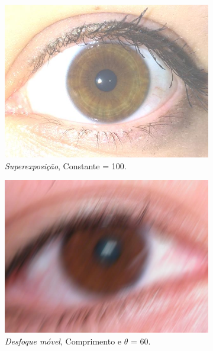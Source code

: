 \begin{figure}[H]
\medskip
\begin{subfigure}{0.25\textwidth}
  \includegraphics[width=\linewidth]{img/Resultados/ruidos/over_exposure100.jpg}
  \caption{\textit{Superexposição}, Constante = 100.}
\end{subfigure}\hfil %
\begin{subfigure}{0.25\textwidth}
  \includegraphics[width=\linewidth]{img/Resultados/ruidos/motion_blur60.jpg}
  \caption{\textit{Desfoque móvel}, Comprimento e $\theta$ = 60.}
\end{subfigure}\hfil %
\begin{subfigure}{0.25\textwidth}

\end{subfigure}
\end{figure}
